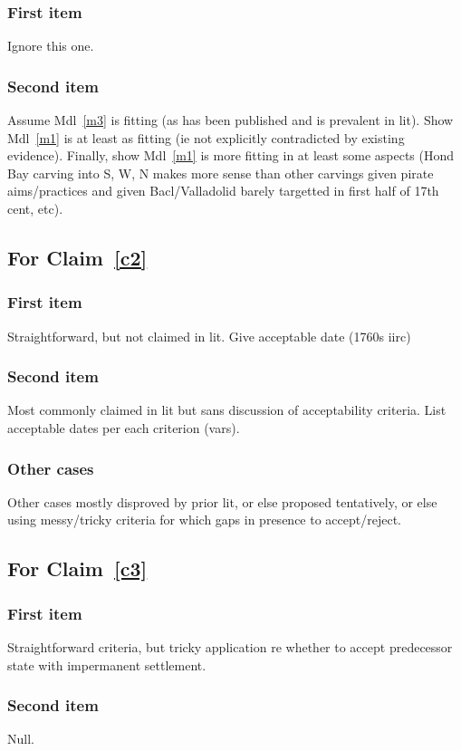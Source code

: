 \documentclass{amsart}
\theoremstyle{definition}%
\theoremstyle{definition}%
\theoremstyle{remark}%
\theoremstyle{definition}%
\theoremstyle{definition}%
\begin{document}
\subsubsection{First item} Ignore this one.
\subsubsection{Second item} Assume Mdl~\ref{m3} is fitting (as has been published and is prevalent in lit). Show Mdl~\ref{m1} is at least as fitting (ie not explicitly contradicted by existing evidence). Finally, show Mdl~\ref{m1} is more fitting in at least some aspects (Hond Bay carving into S, W, N makes more sense than other carvings given pirate aims/practices and given Bacl/Valladolid barely targetted in first half of 17th cent, etc).
%
%
%
%
\subsection{For Claim~\ref{c2}}
\subsubsection{First item} Straightforward, but not claimed in lit. Give acceptable date (1760s iirc)
\subsubsection{Second item} Most commonly claimed in lit but sans discussion of acceptability criteria. List acceptable dates per each criterion (vars).
\subsubsection{Other cases} Other cases mostly disproved by prior lit, or else proposed tentatively, or else using messy/tricky criteria for which gaps in presence to accept/reject.
%
%
%
%
\subsection{For Claim~\ref{c3}}
\subsubsection{First item} Straightforward criteria, but tricky application re whether to accept predecessor state with impermanent settlement.
\subsubsection{Second item} Null.
\end{document}
